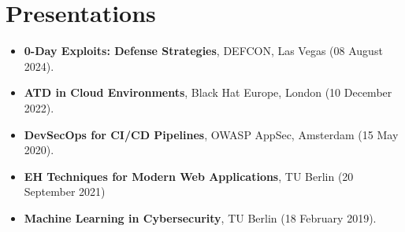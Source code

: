
\section{Presentations}

\begin{itemize}
	\item[\textrightarrow] \textbf{0-Day Exploits: Defense Strategies}, DEFCON, Las Vegas (08 August 2024). \vspace{0.13cm}
	\item[\textrightarrow] \textbf{ATD in Cloud Environments}, Black Hat Europe, London (10 December 2022). \vspace{0.13cm}
	\item[\textrightarrow] \textbf{DevSecOps for CI/CD Pipelines}, OWASP AppSec, Amsterdam (15 May 2020). \vspace{0.13cm}
	\item[\textrightarrow] \textbf{EH Techniques for Modern Web Applications}, TU Berlin (20 September 2021) \vspace{0.13cm}
	\item[\textrightarrow] \textbf{Machine Learning in Cybersecurity}, TU Berlin (18 February 2019). \vspace{0.13cm}
\end{itemize}
